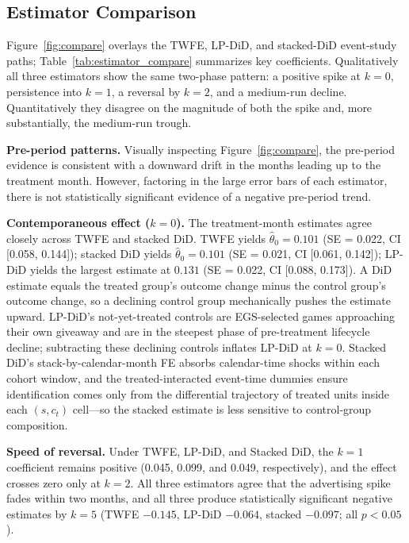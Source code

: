 \documentclass[11pt]{article}
\begin{document}
\subsection{Estimator Comparison}
\label{ssec:compare}

Figure~\ref{fig:compare} overlays the TWFE, LP-DiD, and stacked-DiD event-study
paths; Table~\ref{tab:estimator_compare} summarizes key coefficients.
Qualitatively all three estimators show the same two-phase pattern: a positive
spike at $k = 0$, persistence into $k = 1$, a reversal by $k = 2$, and a
medium-run decline. Quantitatively they disagree on the magnitude of both the
spike and, more substantially, the medium-run trough.

\textbf{Pre-period patterns.} Visually inspecting Figure~\ref{fig:compare}, 
the pre-period evidence is consistent with a downward drift in the months leading
up to the treatment month. However, factoring in the large error bars of each estimator, 
there is not statistically significant evidence of a negative pre-period trend.

\textbf{Contemporaneous effect ($k=0$).} The treatment-month estimates agree
closely across TWFE and stacked DiD. TWFE yields $\hat{\theta}_0 = 0.101$
(SE = 0.022, CI [0.058, 0.144]); stacked DiD yields $\hat{\theta}_0 = 0.101$
(SE = 0.021, CI [0.061, 0.142]); LP-DiD yields the largest estimate at $0.131$
(SE = 0.022, CI [0.088, 0.173]). A DiD estimate equals the treated group's
outcome change minus the control group's outcome change, so a declining control
group mechanically pushes the estimate upward. LP-DiD's not-yet-treated controls
are EGS-selected games approaching their own giveaway and are in the steepest
phase of pre-treatment lifecycle decline; subtracting these declining controls
inflates LP-DiD at $k = 0$. Stacked DiD's stack-by-calendar-month FE absorbs
calendar-time shocks within each cohort window, and the treated-interacted
event-time dummies ensure identification comes only from the differential
trajectory of treated units inside each $(s, c_t)$ cell---so the stacked
estimate is less sensitive to control-group composition.

\textbf{Speed of reversal.} Under TWFE, LP-DiD, and Stacked DiD, the $k = 1$ coefficient
remains positive (0.045, 0.099, and 0.049, respectively), and the effect crosses zero
only at $k = 2$. All three estimators agree that the advertising spike fades within two months,
and all three produce statistically significant negative estimates by $k = 5$ (TWFE $-0.145$,
LP-DiD $-0.064$, stacked $-0.097$; all $p < 0.05$).
\end{document}
